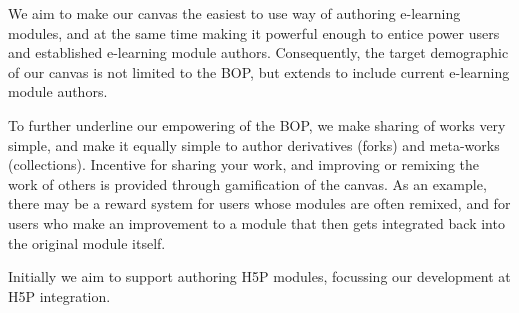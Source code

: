 We aim to make our canvas the easiest to use way of authoring e-learning 
modules, and at the same time making it powerful enough to entice power users 
and established e-learning module authors. Consequently, the target 
demographic of our canvas is not limited to the BOP, but extends to include 
current e-learning module authors.

To further underline our empowering of the BOP, we make sharing of works very 
simple, and make it equally simple to author derivatives (forks) and 
meta-works (collections). Incentive for sharing your work, and improving or 
remixing the work of others is provided through gamification of the canvas. As 
an example, there may be a reward system for users whose modules are often 
remixed, and for users who make an improvement to a module that then gets 
integrated back into the original module itself.

Initially we aim to support authoring H5P modules, focussing our development 
at H5P integration.
